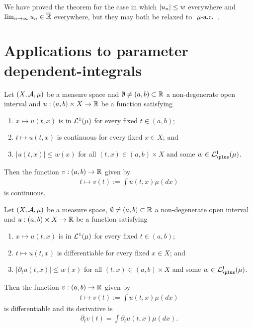 \begin{remark}
	We have proved the theorem for the case in which $\left\vert{u_n}\right\vert \leq w$ everywhere and $\lim_{n\to\infty} u_n \in {\overline{\mathbb{R}}}$ everywhere, but they may both be relaxed to $\ \mu\text{-a.e. }$.
\end{remark}

\section{Applications to parameter dependent-integrals}

\begin{thm}
	\label{thm:continuity-lemma}
	
	Let $(X, \mathcal{A}, \mu)$ be a measure space and $\emptyset \neq (a,b) \subset \mathbb{R}$ a non-degenerate open interval and $u: (a, b) \times X \to \mathbb{R}$ be a function satisfying
	\begin{enumerate}
		\item $x \mapsto u(t, x)$ is in $\mathcal{L}^1(\mu)$ for every fixed $t \in (a, b)$;
		\item $t \mapsto u(t, x)$ is continuous for every fixed $x \in X$; and
		\item $|u(t, x)| \leq w(x)$ for all $(t, x) \in (a, b) \times X$ and some $w \in \calL^1_\plus(\mu)$.
	\end{enumerate}
	Then the function $v: (a, b) \to \mathbb{R}$ given by
	\begin{align}
		t \mapsto v(t) := \int u(t, x) \mu(dx)
	\end{align}
	is continuous.
\end{thm}

\begin{thm}
	\label{thm:differentiability-lemma}
	
	Let $(X, \mathcal{A}, \mu)$ be a measure space, $\emptyset \neq (a, b) \subset \mathbb{R}$ a non-degenerate open interval and $u: (a, b) \times X \to \mathbb{R}$ be a function satisfying
	\begin{enumerate}
		\item $x \mapsto u(t, x)$ is in $\mathcal{L}^1(\mu)$ for every fixed $t \in (a, b)$;
		\item $t \mapsto u(t, x)$ is differentiable for every fixed $x \in X$; and
		\item $|\partial_t u(t, x)| \leq w(x)$ for all $(t, x) \in (a, b) \times X$ and some $w \in \calL^1_\plus(\mu)$.
	\end{enumerate}
	Then the function $v: (a,b) \to \mathbb{R}$ given by
	\begin{align}
		t \mapsto v(t) := \int u(t, x) \mu(dx)
	\end{align}
	is differentiable and its derivative is
	\begin{align}
		\partial_t v(t) = \int \partial_t u(t, x) \mu(dx).
	\end{align}
\end{thm}

